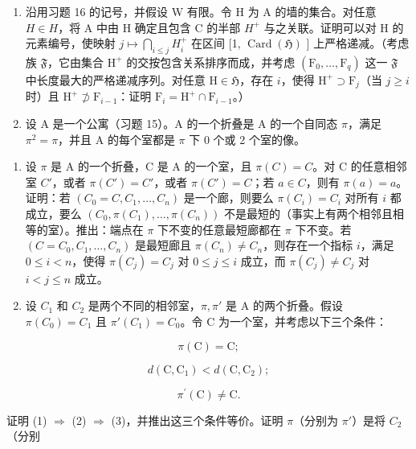 \begin{enumerate}
\def\labelenumi{\arabic{enumi})}
\setcounter{enumi}{16}
\item
  沿用习题 16 的记号，并假设 W 有限。令 H 为 A 的墙的集合。对任意 \(H \in H\)，将 A 中由 H 确定且包含 C 的半部 \(H^{+}\) 与之关联。证明可以对 H 的元素编号，使映射 \(j \mapsto \bigcap_{i \leqslant j} H_{i}^{+}\) 在区间 {[}1, \(\operatorname{Card}(\mathfrak{H})\) {]} 上严格递减。（考虑族 \(\mathfrak{F}\)，它由集合 \(\mathrm{H}^{+}\) 的交按包含关系排序而成，并考虑 \((\mathrm{F}_{0},\ldots,\mathrm{F}_{q})\) 这一 \(\mathfrak{F}\) 中长度最大的严格递减序列。对任意 \(\mathrm{H}\in\mathfrak{H}\)，存在 \(i\)，使得 \(\mathrm{H}^{+}\supset\mathrm{F}_{j}\)（当 \(j\geqslant i\) 时）且 \(\mathrm{H}^{+}\not\supset\mathrm{F}_{i-1}\)：证明 \(\mathrm{F}_{i}=\mathrm{H}^{+}\cap\mathrm{F}_{i-1}\)。）
\item
  设 A 是一个公寓（习题 15）。A 的一个折叠是 A 的一个自同态 \(\pi\)，满足 \(\pi^{2} = \pi\)，并且 A 的每个室都是 \(\pi\) 下 0 个或 2 个室的像。
\end{enumerate}

\begin{enumerate}
\def\labelenumi{\alph{enumi})}
\item
  设 \(\pi\) 是 A 的一个折叠，C 是 A 的一个室，且 \(\pi(C) = C\)。对 C 的任意相邻室 \(C'\)，或者 \(\pi(C') = C'\)，或者 \(\pi(C') = C\)；若 \(a \in C\)，则有 \(\pi(a) = a\)。证明：若 \((C_0 = C, C_1, \ldots, C_n)\) 是一个廊，则要么 \(\pi(C_i) = C_i\) 对所有 \(i\) 都成立，要么 \((C_0, \pi(C_1), \ldots, \pi(C_n))\) 不是最短的（事实上有两个相邻且相等的室）。推出：端点在 \(\pi\) 下不变的任意最短廊都在 \(\pi\) 下不变。若 \((C = C_0, C_1, \ldots, C_n)\) 是最短廊且 \(\pi(C_n) \neq C_n\)，则存在一个指标 \(i\)，满足 \(0 \leqslant i < n\)，使得 \(\pi(C_j) = C_j\) 对 \(0 \leqslant j \leqslant i\) 成立，而 \(\pi(C_j) \neq C_j\) 对 \(i < j \leqslant n\) 成立。
\item
  设 \(C_{1}\) 和 \(C_{2}\) 是两个不同的相邻室，\(\pi, \pi'\) 是 A 的两个折叠。假设 \(\pi(C_{0}) = C_{1}\) 且 \(\pi'(C_{1}) = C_{0}\)。令 C 为一个室，并考虑以下三个条件：
\end{enumerate}

\[
\pi (\mathrm{C}) = \mathrm{C};\tag{1}
\]

\[
d (\mathrm{C}, \mathrm{C} _ {1}) <   d (\mathrm{C}, \mathrm{C} _ {2});\tag{2}
\]

\[
\pi^ {\prime} (\mathrm{C}) \neq \mathrm{C}.\tag{3}
\]

证明 (1) \(\Longrightarrow\) (2) \(\Longrightarrow\) (3)，并推出这三个条件等价。证明 \(\pi\)（分别为 \(\pi'\)）是将 \(C_2\)（分别

